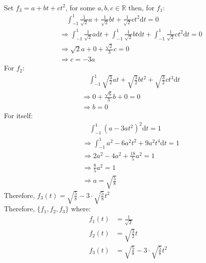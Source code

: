 \documentclass{article}
\begin{document}
\begin{itemize}
\begin{itemize}
\begin{align*}
                    \end{align*}
                    Set \(f_3 = a+bt+ct^2\), for some \(a,b,c\in \mathbb{R}\) then, for \(f_1\):
                    \begin{align*}
                        &\quad\int_{-1}^{1}\frac{1}{\sqrt{2}}a+\frac{1}{\sqrt{2}}bt+\frac{1}{\sqrt{2}}ct^2 \text{d}t=0\\
                        &\Rightarrow \int_{-1}^{1}\frac{1}{\sqrt{2}}a \text{d}t + \int_{-1}^{1}\frac{1}{\sqrt{2}}bt \text{d}t +\int_{-1}^{1}\frac{1}{\sqrt{2}}ct^2 \text{d}t = 0\\
                        &\Rightarrow \sqrt{2}a+0+\frac{\sqrt{2}}{3}c=0\\
                        &\Rightarrow c=-3a
                    \end{align*}
                    For \(f_2\):
                    \begin{align*}
                        &\quad\int_{-1}^{1}\sqrt{\frac{3}{2}}at+\sqrt{\frac{3}{2}}bt^2+\sqrt{\frac{3}{2}}ct^3 \text{d}t\\
                        &\Rightarrow 0+\frac{\sqrt{6}}{3}b+0=0\\
                        &\Rightarrow b=0
                    \end{align*}
                    For itself:
                    \begin{align*}
                        &\quad \int_{-1}^{1}(a-3at^2)^2\text{d}t=1\\
                        &\Rightarrow \int_{-1}^{1}a^2-6a^2t^2+9a^2t^4\text{d}t=1\\
                        &\Rightarrow 2a^2-4a^2+\frac{18}{5}a^2=1\\
                        &\Rightarrow \frac{8}{5}a^2 = 1\\
                        &\Rightarrow a=\sqrt{\frac{5}{8}}
                    \end{align*}
                    Therefore, \(f_3(t)=\sqrt{\frac{5}{8}}-3\cdot\sqrt{\frac{5}{8}}t^2\)\\
                    Therefore, \(\{f_1,f_2,f_3\}\) where:
                    \begin{align*}
                        f_1(t) &= \frac{1}{\sqrt{2}}\\
                        f_2(t) &= \sqrt{\frac{3}{2}}t\\
                        f_3(t) &= \sqrt{\frac{5}{8}}-3\cdot\sqrt{\frac{5}{8}}t^2
                    \end{align*}

\end{itemize}
\end{itemize}
\end{document}

